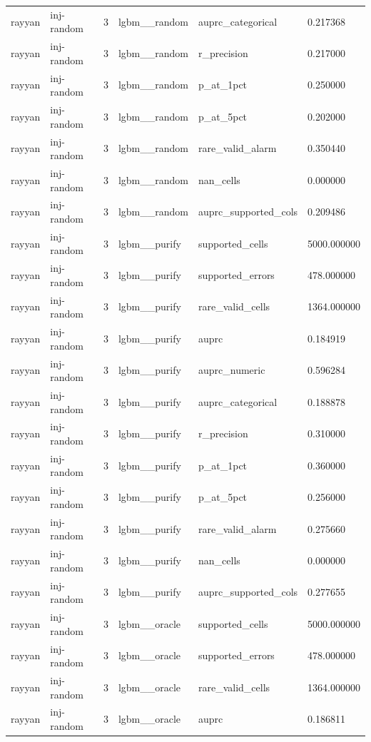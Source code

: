 \begin{tabular}{llllll}
rayyan & inj-random & 3 & lgbm\_\_random & auprc\_categorical & 0.217368 \\
rayyan & inj-random & 3 & lgbm\_\_random & r\_precision & 0.217000 \\
rayyan & inj-random & 3 & lgbm\_\_random & p\_at\_1pct & 0.250000 \\
rayyan & inj-random & 3 & lgbm\_\_random & p\_at\_5pct & 0.202000 \\
rayyan & inj-random & 3 & lgbm\_\_random & rare\_valid\_alarm & 0.350440 \\
rayyan & inj-random & 3 & lgbm\_\_random & nan\_cells & 0.000000 \\
rayyan & inj-random & 3 & lgbm\_\_random & auprc\_supported\_cols & 0.209486 \\
rayyan & inj-random & 3 & lgbm\_\_purify & supported\_cells & 5000.000000 \\
rayyan & inj-random & 3 & lgbm\_\_purify & supported\_errors & 478.000000 \\
rayyan & inj-random & 3 & lgbm\_\_purify & rare\_valid\_cells & 1364.000000 \\
rayyan & inj-random & 3 & lgbm\_\_purify & auprc & 0.184919 \\
rayyan & inj-random & 3 & lgbm\_\_purify & auprc\_numeric & 0.596284 \\
rayyan & inj-random & 3 & lgbm\_\_purify & auprc\_categorical & 0.188878 \\
rayyan & inj-random & 3 & lgbm\_\_purify & r\_precision & 0.310000 \\
rayyan & inj-random & 3 & lgbm\_\_purify & p\_at\_1pct & 0.360000 \\
rayyan & inj-random & 3 & lgbm\_\_purify & p\_at\_5pct & 0.256000 \\
rayyan & inj-random & 3 & lgbm\_\_purify & rare\_valid\_alarm & 0.275660 \\
rayyan & inj-random & 3 & lgbm\_\_purify & nan\_cells & 0.000000 \\
rayyan & inj-random & 3 & lgbm\_\_purify & auprc\_supported\_cols & 0.277655 \\
rayyan & inj-random & 3 & lgbm\_\_oracle & supported\_cells & 5000.000000 \\
rayyan & inj-random & 3 & lgbm\_\_oracle & supported\_errors & 478.000000 \\
rayyan & inj-random & 3 & lgbm\_\_oracle & rare\_valid\_cells & 1364.000000 \\
rayyan & inj-random & 3 & lgbm\_\_oracle & auprc & 0.186811 \\

\end{tabular}

